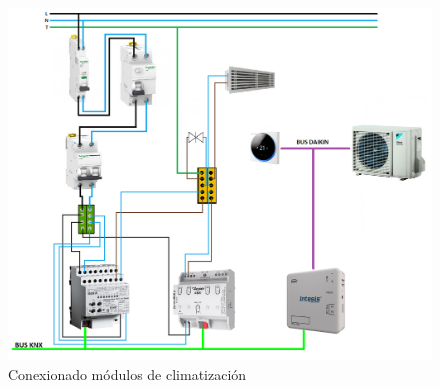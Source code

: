 \begin{flushleft}
\begin{figure}[H]
\includegraphics[width=1.15\textwidth]{figures/conex_clima.png}   
\caption{Conexionado módulos de climatización}
\label{fig:conex_clima}
\end{figure}
\end{flushleft}

